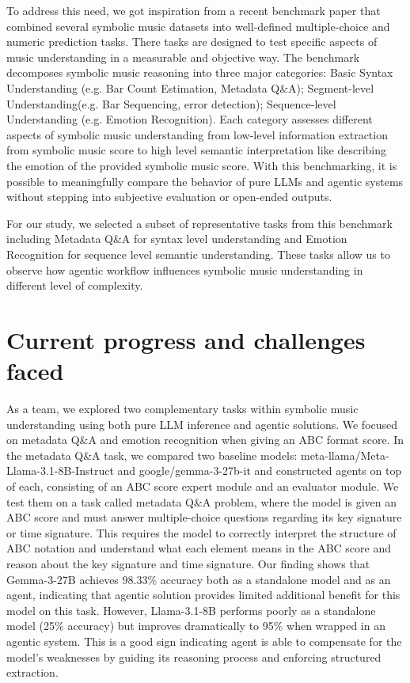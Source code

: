 \documentclass[11pt]{article} %
\begin{document}
To address this need, we got inspiration from a recent benchmark paper that combined several symbolic music datasets into well-defined multiple-choice and numeric prediction tasks. There tasks are designed to test specific aspects of music understanding in a measurable and objective way. The benchmark decomposes symbolic music reasoning into three major categories: Basic Syntax Understanding (e.g. Bar Count Estimation, Metadata  Q\&A); Segment-level Understanding(e.g. Bar Sequencing, error detection); Sequence-level Understanding (e.g. Emotion Recognition). Each category assesses different aspects of symbolic music understanding from low-level information extraction from symbolic music score to high level semantic interpretation like describing the emotion of the provided symbolic music score.  With this benchmarking, it is possible to meaningfully compare the behavior of pure LLMs and agentic systems without stepping into subjective evaluation or open-ended outputs.   

For our study, we selected a subset of representative tasks from this benchmark including Metadata Q\&A for syntax level understanding and Emotion Recognition for sequence level semantic understanding. These tasks allow us to observe how agentic workflow influences symbolic music understanding in different level of complexity. 

\section{Current progress and challenges faced}
As a team, we explored two complementary tasks within symbolic music understanding using both pure LLM inference and agentic solutions. We focused on metadata Q\&A and emotion recognition when giving an ABC format score.
In the metadata Q\&A task, we compared two baseline models: meta-llama/Meta-Llama-3.1-8B-Instruct and google/gemma-3-27b-it and constructed agents on top of each, consisting of an ABC score expert module and an evaluator module. We test them on a task called metadata Q\&A problem, where the model is given an ABC score and must answer multiple-choice questions regarding its key signature or time signature. This requires the model to correctly interpret the structure of ABC notation and understand what each element means in the ABC score and reason about the key signature and time signature. Our finding shows that Gemma-3-27B achieves 98.33\% accuracy both as a standalone model and as an agent, indicating that agentic solution provides limited additional benefit for this model on this task. However, Llama-3.1-8B performs poorly as a standalone model (25\% accuracy) but improves dramatically to 95\% when wrapped in an agentic system. This is a good sign indicating agent is able to compensate for the model’s weaknesses by guiding its reasoning process and enforcing structured extraction. 
\end{document}
